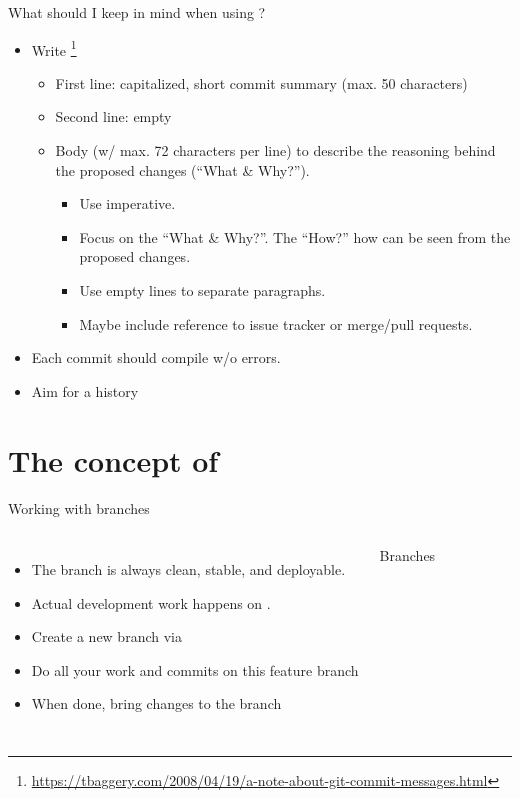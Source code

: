 \begin{frame}{What should I keep in mind when using ?}
\begin{itemize}
\item Write \footnote{\scriptsize{\url{https://tbaggery.com/2008/04/19/a-note-about-git-commit-messages.html}}}
\begin{itemize}
\item First line: capitalized, short commit summary (max. 50 characters)
\item Second line: empty
\item Body (w/ max. 72 characters per line) to describe the reasoning behind the proposed changes (``What \& Why?'').
\begin{itemize}
\item Use imperative.
\item Focus on the ``What \& Why?''. The ``How?'' how can be seen from the proposed changes.
\item Use empty lines to separate paragraphs.
\item Maybe include reference to issue tracker or merge/pull requests.
\end{itemize}
\end{itemize}
\item Each commit should compile w/o errors.
\item Aim for a  history
\end{itemize}
\end{frame}

\section{The concept of }

\begin{frame}{Working with branches}
\begin{columns}[T]
\begin{itemize}
\item The  branch is always clean, stable, and deployable.
\item Actual development work happens on .
\item Create a new branch via 
\item Do all your work and commits on this feature branch 
\item When done, bring changes to the  branch
\end{itemize}
\begin{block}{Branches}
\vspace{17em}
\end{block}
\end{columns}
\end{frame}

